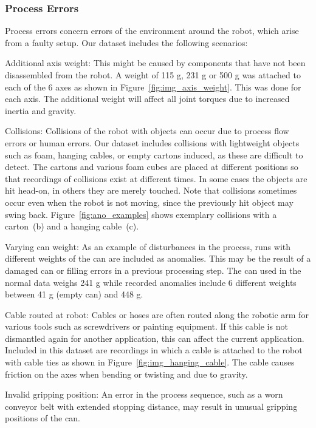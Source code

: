 \documentclass[journal]{IEEEtran}
\newenvironment{packed_enum}{
\begin{itemize}
  \setlength{\itemsep}{3pt}
  \setlength{\parskip}{0pt}
  \setlength{\parsep}{0pt}
}{\end{itemize}}
\begin{document}
\subsubsection{Process Errors} 
Process errors concern errors of the environment around the robot, which arise from a faulty setup.
Our dataset includes the following scenarios:
\begin{packed_enum}
    \item Additional axis weight:
    This might be caused by components that have not been disassembled from the robot.
    A weight of {115 g, 231 g or 500 g} was attached to each of the 6 axes as shown in Figure~\ref{fig:img_axis_weight}.
    This was done for each axis.
    The additional weight will affect all joint torques due to increased inertia and gravity. 
    \item Collisions:
    Collisions of the robot with objects can occur due to process flow errors or human errors. Our dataset includes collisions with lightweight objects such as foam, hanging cables, or empty cartons induced, as these are difficult to detect.
    The cartons and various foam cubes are placed at different positions so that recordings of collisions exist at different times.
    In some cases the objects are hit head-on, in others they are merely touched. Note that collisions sometimes occur even when the robot is not moving, since the previously hit object may swing back.
    Figure~\ref{fig:ano_examples} shows exemplary collisions with a carton~(b) and a hanging cable~(c).
    \item Varying can weight:
    As an example of disturbances in the process, runs with different weights of the can are included as anomalies.
    This may be the result of a damaged can or filling errors in a previous processing step.
    The can used in the normal data weighs {241 g} while recorded anomalies include 6 different weights between {41 g} (empty can) and {448 g}.
    \item Cable routed at robot:
    Cables or hoses are often routed along the robotic arm for various tools such as screwdrivers or painting equipment.
    If this cable is not dismantled again for another application, this can affect the current application.
    Included in this dataset are recordings in which a cable is attached to the robot with cable ties as shown in Figure~\ref{fig:img_hanging_cable}.
    {The cable causes friction on the axes when bending or twisting and due to gravity.}
    \item Invalid gripping position:
    An error in the process sequence, such as a worn conveyor belt with extended stopping distance, may result in unusual gripping positions of the can.

\end{packed_enum}
\end{document}
